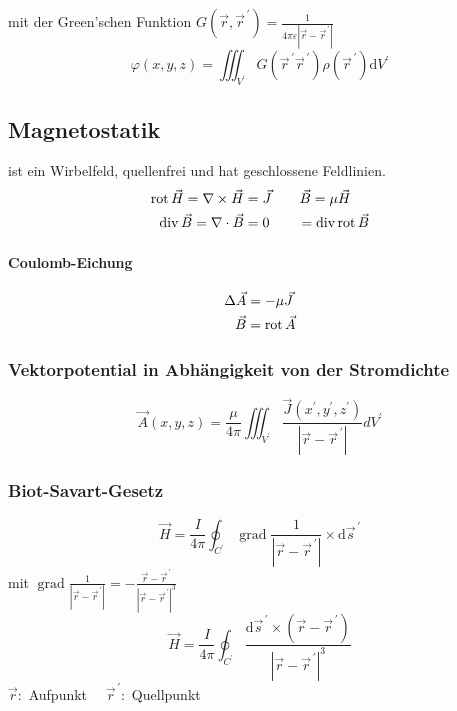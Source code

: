 mit der Green'schen Funktion $G\left(\vec{r}, \vec{r}^{\,\prime}\right)=\frac{1}{4 \pi \varepsilon\left|\vec{r}-\vec{r}^{\,\prime}\right|}$
\[\varphi(x, y, z)=\iiint_{V^{\prime}} G\left(\vec{r}^{\,\prime} \vec{r}^{\,\prime}\right) \rho\left(\vec{r}^{\,\prime}\right) \mathrm{d} V^{\prime}\]


\subsection{Magnetostatik}
ist ein Wirbelfeld, quellenfrei und hat geschlossene Feldlinien.
\begin{align*}
    \operatorname{rot} \vec{H} = \nabla \times \vec{H} & = \vec{J}  \qquad \vec{B} = \mu \vec{H}   \\
    \operatorname{div} \vec{B} = \nabla \cdot \vec{B}  & = 0        \qquad = \operatorname{div} \operatorname{rot} \vec{B}
\end{align*}

\paragraph*{Coulomb-Eichung}
\begin{align*}
    \Delta \vec{A} &= - \mu \vec{J} \\
    \vec{B} &= \operatorname{rot} \vec{A}
\end{align*}

\subsubsection{Vektorpotential in Abhängigkeit von der Stromdichte}
\[ \vec{A}(x, y, z)=\frac{\mu}{4 \pi} \iiint_{V^{\prime}} \frac{\vec{J}\left(x^{\prime}, y^{\prime}, z^{\prime}\right)}{\left|\vec{r}-\vec{r}^{\,\prime}\right|} d V^{\prime} \]

\subsubsection{Biot-Savart-Gesetz}
\[ \vec{H}=\frac{I}{4 \pi} \oint_{C^{\prime}} \operatorname{grad} \frac{1}{\left|\vec{r}-\vec{r}^{\,\prime}\right|} \times \mathrm{d} \vec{s}^{\,\prime}\]
mit $\operatorname{grad} \frac{1}{\left|\vec{r}-\vec{r}^{\,\prime}\right|}=-\frac{\vec{r}-\vec{r}^{\,\prime}}{\left|\vec{r}-\vec{r}^{\,\prime}\right|^{3}}$
\[\vec{H}=\frac{I}{4 \pi} \oint_{C^{\prime}} \frac{\mathrm{d} \vec{s}^{\,\prime} \times\left(\vec{r}-\vec{r}^{\,\prime}\right)}{\left|\vec{r}-\vec{r}^{\,\prime}\right|^{3}}\]
$\vec{r}:$ Aufpunkt $\quad \vec{r}^{\,\prime}:$ Quellpunkt


